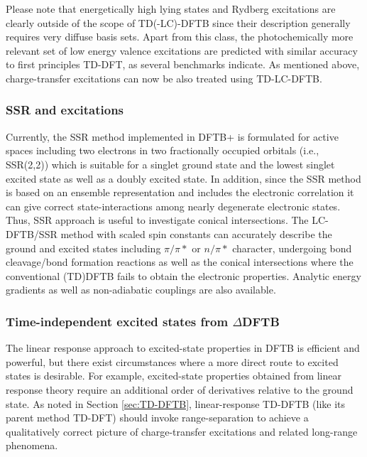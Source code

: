 \documentclass{revtex4-1}
\newcommand{\dftbp}{DFTB+}
\begin{document}
Please note that energetically high lying states and Rydberg excitations are
clearly outside of the scope of TD(-LC)-DFTB since their description generally
requires very diffuse basis sets. Apart from this class, the photochemically
more relevant set of low energy valence excitations are predicted with similar
accuracy to first principles TD-DFT, as several benchmarks
indicate.\cite{trani2011time,Dominguez2013,fihey2019performances} As mentioned
above, charge-transfer excitations can now be also treated using
TD-LC-DFTB.\cite{Kranz2017}

\subsubsection{SSR and excitations}
\label{para:ssrxc}

Currently, the SSR method implemented in \dftbp{} is formulated for active
spaces including two electrons in two fractionally occupied orbitals (i.e.,
SSR(2,2)) which is suitable for a singlet ground state and the lowest singlet
excited state as well as a doubly excited state.\cite{Lee19} In addition, since
the SSR method is based on an ensemble representation and includes the
electronic correlation it can give correct state-interactions among nearly
degenerate electronic states. Thus, SSR approach is useful to investigate
conical intersections. The LC-DFTB/SSR method with scaled spin constants can
accurately describe the ground and excited states including $\pi/\pi*$ or
$n/\pi*$ character, undergoing bond cleavage/bond formation reactions as well as
the conical intersections where the conventional (TD)DFTB fails to obtain the
electronic properties. Analytic energy gradients as well as non-adiabatic
couplings are also available.


\subsubsection{Time-independent excited states from $\Delta$DFTB}

The linear response approach to excited-state properties in DFTB is efficient
and powerful, but there exist circumstances where a more direct route to excited
states is desirable. For example, excited-state properties obtained from linear
response theory require an additional order of derivatives relative to the
ground state. As noted in Section \ref{sec:TD-DFTB}, linear-response TD-DFTB
(like its parent method TD-DFT)\cite{Dreuw2004} should invoke range-separation
to achieve a qualitatively correct picture of charge-transfer excitations and
related long-range phenomena.\cite{Kranz2017}
\end{document}
